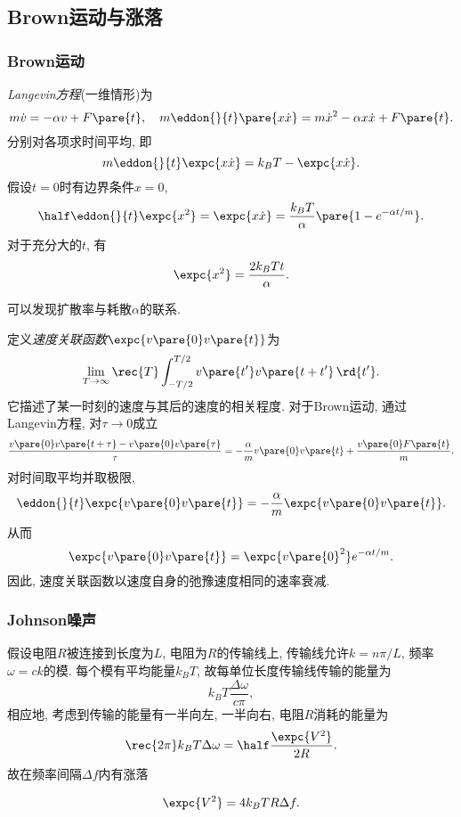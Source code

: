 \documentclass[../Thermal.tex]{subfiles}
\begin{document}
\subsection{Brown运动与涨落}
\subsubsection{Brown运动}
\emph{Langevin方程}(一维情形)为
\[ m\dot{v} = -\alpha v + F\pare{t},\quad m\eddon{}{t}\pare{x\dot{x}} = m\dot{x}^2 - \alpha x \dot{x} + F\pare{t}. \]
分别对各项求时间平均, 即
\[ m\eddon{}{t}\expc{x\dot{x}} = k_B T - \expc{x\dot{x}}. \]
假设$t=0$时有边界条件$x=0$,
\[ \half \eddon{}{t}\expc{x^2} = \expc{x\dot{x}} = \frac{k_BT}{\alpha}\pare{1-e^{-\alpha t/m}}. \]
对于充分大的$t$, 有
\[ \expc{x^2} = \frac{2k_BTt}{\alpha}. \]
\begin{remark}
可以发现扩散率与耗散$\alpha$的联系.
\end{remark}
定义\emph{速度关联函数}$\expc{v\pare{0}v\pare{t}}$为
\[ \lim_{T\rightarrow\infty} \rec{T}\int_{-T/2}^{T/2} v\pare{t'}v\pare{t+t'}\,\rd{t'}. \]
它描述了某一时刻的速度与其后的速度的相关程度. 对于Brown运动, 通过Langevin方程, 对$\tau\rightarrow 0$成立
\[ \frac{v\pare{0}v\pare{t+\tau} - v\pare{0}v\pare{\tau}}{\tau} = -\frac{\alpha}{m} v\pare{0}v\pare{t} + \frac{v\pare{0}F\pare{t}}{m}. \]
对时间取平均并取极限,
\[ \eddon{}{t}\expc{v\pare{0}v\pare{t}} = -\frac{\alpha}{m}\expc{v\pare{0}v\pare{t}}. \]
从而
\[ \expc{v\pare{0}v\pare{t}} = \expc{v\pare{0}^2}e^{-\alpha t/m}. \]
因此, 速度关联函数以速度自身的弛豫速度相同的速率衰减.
\subsubsection{Johnson噪声}
假设电阻$R$被连接到长度为$L$, 电阻为$R$的传输线上, 传输线允许$k=n\pi/L$, 频率$\omega = ck$的模. 每个模有平均能量$k_B T$, 故每单位长度传输线传输的能量为
\[ k_BT\frac{\Delta \omega}{c\pi}, \]
相应地, 考虑到传输的能量有一半向左, 一半向右, 电阻$R$消耗的能量为
\[ \rec{2\pi}k_BT\Delta\omega = \half \frac{\expc{V^2}}{2R}. \]
故在频率间隔$\Delta f$内有涨落
\begin{finale}
\[ \expc{V^2} = 4k_BTR\Delta f. \]
\end{finale}
\end{document}
